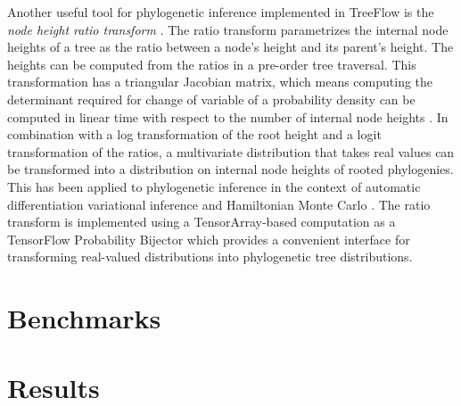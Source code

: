 Another useful tool for phylogenetic inference implemented in TreeFlow is the \textit{node height ratio transform} \cite{kishino2001performance}. The ratio transform parametrizes the internal node heights of a tree as the ratio between a node's height and its parent's height. The heights can be computed from the ratios in a pre-order tree traversal. This transformation has a triangular Jacobian matrix, which means computing the determinant required for change of variable of a probability density can be computed in linear time with respect to the number of internal node heights \cite{fourment2019evaluating}. In combination with a log transformation of the root height and a logit transformation of the ratios, a multivariate distribution that takes real values can be transformed into a distribution on internal node heights of rooted phylogenies. This has been applied to phylogenetic inference in the context of automatic differentiation variational inference \cite{fourment2019evaluating} and Hamiltonian Monte Carlo \cite{ji2021scalable}. The ratio transform is implemented using a TensorArray-based computation as a TensorFlow Probability Bijector which provides a convenient interface for transforming real-valued distributions into phylogenetic tree distributions. 

\section{Benchmarks}

\section{Results}


